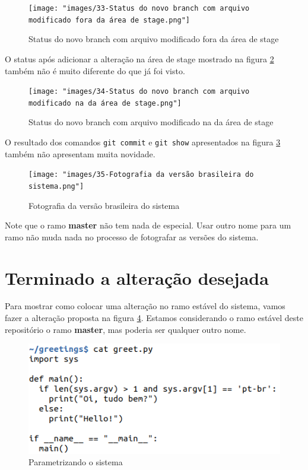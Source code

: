 \documentclass[a4paper]{book}
\begin{document}
\begin{figure}[ht]
\caption{Status do novo branch com arquivo modificado fora da área de stage}
\label{fig:33}
\centering
\texttt{[image: "images/33-Status do novo branch com arquivo modificado fora da área de stage.png"]}
\end{figure}

O status após adicionar a alteração na área de stage
mostrado na figura \ref{fig:34} também não é muito 
diferente do que já foi visto.

\begin{figure}[ht]
\caption{Status do novo branch com arquivo modificado na da área de stage}
\label{fig:34}
\centering
\texttt{[image: "images/34-Status do novo branch com arquivo modificado na da área de stage.png"]}
\end{figure}

O resultado dos comandos \texttt{git commit} 
e \texttt{git show} apresentados na
figura \ref{fig:35} também não apresentam muita novidade.

\begin{figure}[!h]
\caption{Fotografia da versão brasileira do sistema}
\label{fig:35}
\centering
\texttt{[image: "images/35-Fotografia da versão brasileira do sistema.png"]}
\end{figure}

Note que o ramo \textbf{master} não tem nada de especial.
Usar outro nome para um ramo não muda nada no processo
de fotografar as versões do sistema.

\newpage
\section{Terminado a alteração desejada}

Para mostrar como colocar uma alteração no ramo estável do
sistema, vamos fazer a alteração proposta na 
figura \ref{fig:36}.
Estamos considerando o ramo estável deste repositório
o ramo \textbf{master}, mas poderia ser qualquer outro nome.

\begin{figure}[ht]
\caption{Parametrizando o sistema}
\label{fig:36}
\centering
\includegraphics[scale=0.6,left]{"images/36-Parametrizando o sistema.png"}
\end{figure}
\end{document}
